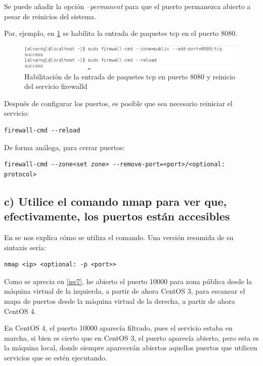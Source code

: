 Se puede añadir la opción \textit{--permanent} para que el puerto permanezca abierto a pesar de reinicios del sistema.

Por, ejemplo, en \ref{ise6} se habilita la entrada de paquetes tcp en el puerto 8080.

\begin{figure}[H]
	\centering
	\includegraphics[scale=0.6]{ise6.png}
	\caption{Habilitación de la entrada de paquetes tcp en puerto 8080 y reinicio del servicio firewalld} \label{ise6}
\end{figure}

Después de configurar los puertos, es posible que sea necesario reiniciar el servicio:

\begin{verbatim}
firewall-cmd --reload
\end{verbatim}

De forma análoga, para cerrar puertos:

\begin{verbatim}
firewall-cmd --zone<set zone> --remove-port=<port>/<optional: protocol>
\end{verbatim}

\subsection{c) Utilice el comando nmap para ver que, efectivamente, los puertos están accesibles}

En \cite{nmap} se nos explica cómo se utiliza el comando. Una versión resumida de su sintaxis sería:

\begin{verbatim}
nmap <ip> <optional: -p <port>>
\end{verbatim}

Como se aprecia en \ref{ise7}, he abierto el puerto 10000 para zona pública desde la máquina virtual de la izquierda, a partir de ahora CentOS 3, para escanear el mapa de puertos desde la máquina virtual de la derecha, a partir de ahora CentOS 4.

En CentOS 4, el puerto 10000 aparecía filtrado, pues el servicio estaba en marcha, si bien es cierto que en CentOS 3, el puerto aparecía abierto, pero esta es la máquina local, donde siempre aparecerán abiertos aquellos puertos que utilicen servicios que se estén ejecutando.

